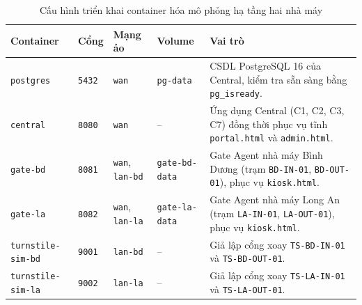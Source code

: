 \begin{table}[H]
\centering
\caption{Cấu hình triển khai container hóa mô phỏng hạ tầng hai nhà máy}
\label{tab:docker-deployment-topology}
\small
\renewcommand{\arraystretch}{1.25}
\begin{tabularx}{\textwidth}{|>{\raggedright\arraybackslash}p{2.7cm}|>{\raggedright\arraybackslash}p{1.8cm}|>{\raggedright\arraybackslash}p{2.3cm}|>{\raggedright\arraybackslash}p{2.2cm}|>{\raggedright\arraybackslash}X|}
\hline
\textbf{Container} & \textbf{Cổng} & \textbf{Mạng ảo} & \textbf{Volume} & \textbf{Vai trò} \\
\hline
\texttt{postgres} & \texttt{5432} & \texttt{wan} & \texttt{pg-data} & CSDL PostgreSQL 16 của Central, kiểm tra sẵn sàng bằng \texttt{pg\_isready}. \\
\hline
\texttt{central} & \texttt{8080} & \texttt{wan} & -- & Ứng dụng Central (C1, C2, C3, C7) đồng thời phục vụ tĩnh \texttt{portal.html} và \texttt{admin.html}. \\
\hline
\texttt{gate-bd} & \texttt{8081} & \texttt{wan}, \texttt{lan-bd} & \texttt{gate-bd-data} & Gate Agent nhà máy Bình Dương (trạm \texttt{BD-IN-01}, \texttt{BD-OUT-01}), phục vụ \texttt{kiosk.html}. \\
\hline
\texttt{gate-la} & \texttt{8082} & \texttt{wan}, \texttt{lan-la} & \texttt{gate-la-data} & Gate Agent nhà máy Long An (trạm \texttt{LA-IN-01}, \texttt{LA-OUT-01}), phục vụ \texttt{kiosk.html}. \\
\hline
\texttt{turnstile-sim-bd} & \texttt{9001} & \texttt{lan-bd} & -- & Giả lập cổng xoay \texttt{TS-BD-IN-01} và \texttt{TS-BD-OUT-01}. \\
\hline
\texttt{turnstile-sim-la} & \texttt{9002} & \texttt{lan-la} & -- & Giả lập cổng xoay \texttt{TS-LA-IN-01} và \texttt{TS-LA-OUT-01}. \\
\hline
\end{tabularx}
\end{table}

